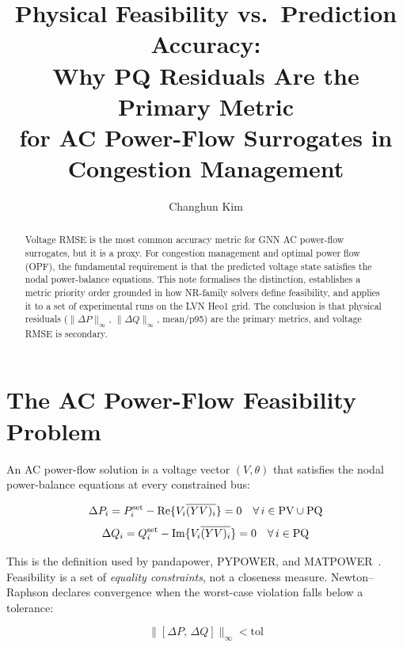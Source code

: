 \documentclass{article}
\title{Physical Feasibility vs.\ Prediction Accuracy:\\
  Why PQ Residuals Are the Primary Metric\\
  for AC Power-Flow Surrogates in Congestion Management}
\author{Changhun Kim}
\begin{document}
\maketitle

\begin{abstract}
  Voltage RMSE is the most common accuracy metric for GNN AC power-flow
  surrogates, but it is a proxy.  For congestion management and optimal
  power flow (OPF), the fundamental requirement is that the predicted
  voltage state satisfies the nodal power-balance equations.  This note
  formalises the distinction, establishes a metric priority order grounded
  in how NR-family solvers define feasibility, and applies it to a set of
  experimental runs on the LVN Heo1 grid.  The conclusion is that physical
  residuals ($\|\Delta P\|_\infty$, $\|\Delta Q\|_\infty$, mean/p95) are
  the primary metrics, and voltage RMSE is secondary.
\end{abstract}

\section{The AC Power-Flow Feasibility Problem}

An AC power-flow solution is a voltage vector $(V, \theta)$ that satisfies
the nodal power-balance equations at every constrained bus:

\begin{equation}
  \Delta P_i = P_i^{\rm set} - \mathrm{Re}\{V_i \overline{(YV)_i}\} = 0
  \quad \forall\, i \in \text{PV} \cup \text{PQ}
  \label{eq:dp}
\end{equation}
\begin{equation}
  \Delta Q_i = Q_i^{\rm set} - \mathrm{Im}\{V_i \overline{(YV)_i}\} = 0
  \quad \forall\, i \in \text{PQ}
  \label{eq:dq}
\end{equation}

This is the definition used by pandapower, PYPOWER, and MATPOWER~\cite{matpower}.
Feasibility is a set of \emph{equality constraints}, not a closeness measure.
Newton--Raphson declares convergence when the worst-case violation falls below
a tolerance:

\begin{equation}
  \|[\Delta P,\, \Delta Q]\|_\infty < \text{tol}
  \label{eq:nrconv}
\end{equation}
\end{document}
